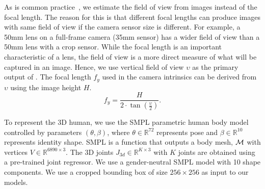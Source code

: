 As is common practice~\cite{wildcamera,ctrlc,spec}, we estimate the field of view from images instead of the focal length. The reason for this is that different focal lengths can produce images with same field of view if the camera sensor size is different. For example, a 50mm lens on a full-frame camera (35mm sensor) has a wider field of view than a 50mm lens with a crop sensor. While the focal length is an important characteristic of a lens, the field of view is a more direct measure of what will be captured in an image. Hence, we use vertical field of view $\upsilon$ as the primary output of \cameramodel. The focal length $f_y$ used in the camera intrinsics can be derived from $\upsilon$ using the image height $H$.
\begin{equation}
f_y  = \frac{H}{2 \cdot \tan\left(\frac{\upsilon}{2}\right)} .
\label{eq: fl_from_fov}
\end{equation}

To represent the 3D human, we use the SMPL parametric human body model \cite{smpl}  controlled by parameters $(\theta, \beta)$, where $\theta \in \mathbb{R}^{72}$ represents pose and $\beta \in \mathbb{R}^{10}$ represents identity shape. 
SMPL is a function that outputs a body mesh, $\mathcal{M}$  with vertices ${V} \in \mathbb{R}^{6890\times3}$. The 3D joints  ${J_{3d}} \in \mathbb{R}^{K\times3}$ with $K$ joints are obtained using a pre-trained joint regressor. We use a gender-neutral SMPL model with 10 shape components. We use a cropped bounding box of size $256\times256$ as input to our models.

\subsection{\cameramodel}

